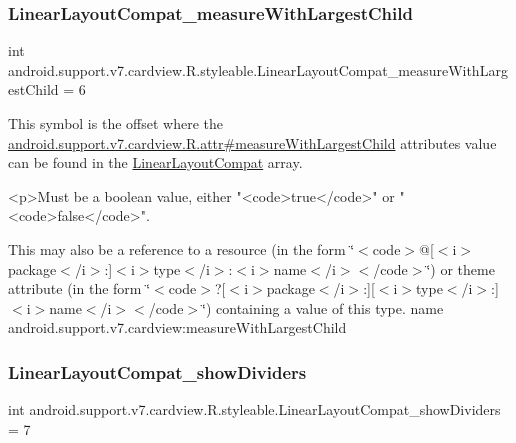\subsubsection{\texorpdfstring{Linear\+Layout\+Compat\+\_\+measure\+With\+Largest\+Child}{LinearLayoutCompat\_measureWithLargestChild}}
{\footnotesize\ttfamily int android.\+support.\+v7.\+cardview.\+R.\+styleable.\+Linear\+Layout\+Compat\+\_\+measure\+With\+Largest\+Child = 6\hspace{0.3cm}{\ttfamily [static]}}

This symbol is the offset where the \hyperlink{classandroid_1_1support_1_1v7_1_1cardview_1_1R_1_1attr_a310436bd0218ec6341dca4db85bbf509}{android.\+support.\+v7.\+cardview.\+R.\+attr\#measure\+With\+Largest\+Child} attribute\textquotesingle{}s value can be found in the \hyperlink{classandroid_1_1support_1_1v7_1_1cardview_1_1R_1_1styleable_a700813433e97ff82dc1f2263b2072586}{Linear\+Layout\+Compat} array.

\begin{DoxyVerb}      <p>Must be a boolean value, either "<code>true</code>" or "<code>false</code>".
\end{DoxyVerb}
 

This may also be a reference to a resource (in the form \char`\"{}$<$code$>$@\mbox{[}$<$i$>$package$<$/i$>$\+:\mbox{]}$<$i$>$type$<$/i$>$\+:$<$i$>$name$<$/i$>$$<$/code$>$\char`\"{}) or theme attribute (in the form \char`\"{}$<$code$>$?\mbox{[}$<$i$>$package$<$/i$>$\+:\mbox{]}\mbox{[}$<$i$>$type$<$/i$>$\+:\mbox{]}$<$i$>$name$<$/i$>$$<$/code$>$\char`\"{}) containing a value of this type.  name android.\+support.\+v7.\+cardview\+:measure\+With\+Largest\+Child \mbox{\label{classandroid_1_1support_1_1v7_1_1cardview_1_1R_1_1styleable_a283ec7224bcb5e6c731bcef2e91802f0}} 
\subsubsection{\texorpdfstring{Linear\+Layout\+Compat\+\_\+show\+Dividers}{LinearLayoutCompat\_showDividers}}
{\footnotesize\ttfamily int android.\+support.\+v7.\+cardview.\+R.\+styleable.\+Linear\+Layout\+Compat\+\_\+show\+Dividers = 7\hspace{0.3cm}{\ttfamily [static]}}

